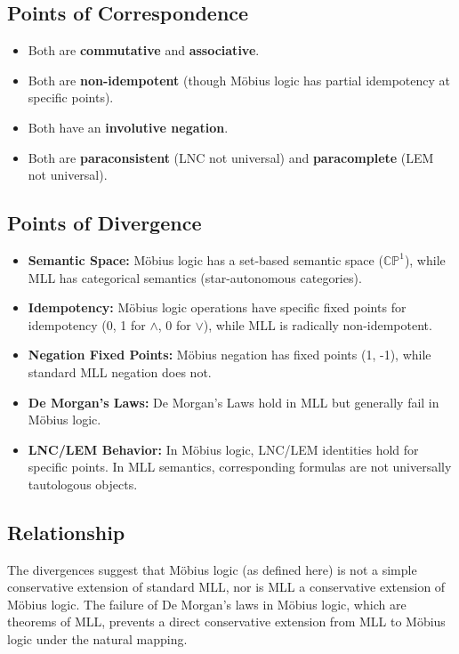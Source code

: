 	\subsection{Points of Correspondence}
	\begin{itemize}
		\item Both are \textbf{commutative} and \textbf{associative}.
		\item Both are \textbf{non-idempotent} (though M\"{o}bius logic has partial idempotency at specific points).
		\item Both have an \textbf{involutive negation}.
		\item Both are \textbf{paraconsistent} (LNC not universal) and \textbf{paracomplete} (LEM not universal).
	\end{itemize}

	\subsection{Points of Divergence}
	\begin{itemize}
		\item \textbf{Semantic Space:} M\"{o}bius logic has a set-based semantic space ($\mathbb{CP}^1$), while MLL has categorical semantics (star-autonomous categories).
		\item \textbf{Idempotency:} M\"{o}bius logic operations have specific fixed points for idempotency ({0, 1} for $\wedge$, {0} for $\vee$), while MLL is radically non-idempotent.
		\item \textbf{Negation Fixed Points:} M\"{o}bius negation has fixed points ({1, -1}), while standard MLL negation does not.
		\item \textbf{De Morgan's Laws:} De Morgan's Laws hold in MLL but generally fail in M\"{o}bius logic.
		\item \textbf{LNC/LEM Behavior:} In M\"{o}bius logic, LNC/LEM identities hold for specific points. In MLL semantics, corresponding formulas are not universally tautologous objects.
	\end{itemize}

	\subsection{Relationship}
	The divergences suggest that M\"{o}bius logic (as defined here) is not a simple conservative extension of standard MLL, nor is MLL a conservative extension of M\"{o}bius logic. The failure of De Morgan's laws in M\"{o}bius logic, which are theorems of MLL, prevents a direct conservative extension from MLL to M\"{o}bius logic under the natural mapping.

